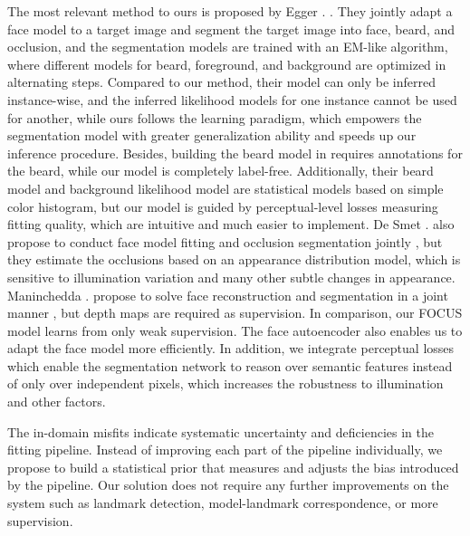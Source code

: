 \documentclass[10pt,twocolumn,letterpaper]{article}
\begin{document}
The most relevant method to ours is proposed by Egger \etal. \cite{egger2018occlusion}. 
They jointly adapt a face model to a target image and segment the target image into face, beard, and occlusion, and the segmentation models are trained with an EM-like algorithm, where different models for beard, foreground, and background are optimized in alternating steps. Compared to our method, their model can only be inferred instance-wise, and the inferred likelihood models for one instance cannot be used for another, while ours follows the learning paradigm, which empowers the segmentation model with greater generalization ability and speeds up our inference procedure. Besides, building the beard model in \cite{egger2018occlusion} requires annotations for the beard, while our model is completely label-free. Additionally, their beard model and background likelihood model are statistical models based on simple color histogram, but our model is guided by perceptual-level losses measuring fitting quality, which are intuitive and much easier to implement.
De Smet \etal. also propose to conduct face model fitting and occlusion segmentation jointly \cite{1640924}, but they estimate the occlusions based on an appearance distribution model, which is sensitive to illumination variation and many other subtle changes in appearance. Maninchedda \etal. propose to solve face reconstruction and segmentation in a joint manner \cite{maninchedda2016semantic}, but depth maps are required as supervision. 
In comparison, our FOCUS model learns from only weak supervision.
The face autoencoder also enables us to adapt the face model more efficiently. In addition, we integrate perceptual losses which enable the segmentation network to reason over semantic features instead of only over independent pixels, which increases the robustness to illumination and other factors.

The in-domain misfits indicate systematic uncertainty and deficiencies in the fitting pipeline.
Instead of improving each part of the pipeline individually, we propose to build a statistical prior that measures and adjusts the bias introduced by the pipeline.
Our solution does not require any further improvements on the system such as landmark detection, model-landmark correspondence, or more supervision.
\end{document}
